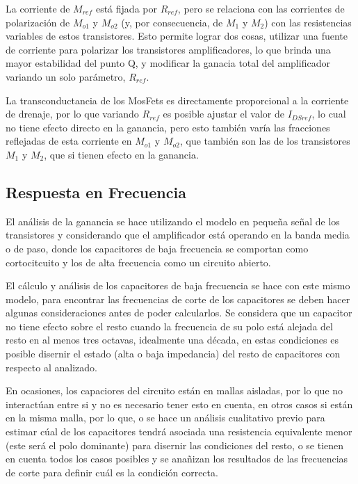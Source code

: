 La corriente de $M_{ref}$ está fijada por $R_{ref}$, pero se relaciona con las corrientes de polarización de $M_{o1}$ y $M_{o2}$ (y, por consecuencia, de $M_{1}$ y $M_{2}$) con las resistencias variables de estos transistores. Esto permite lograr dos cosas, utilizar una fuente de corriente para polarizar los transistores amplificadores, lo que brinda una mayor estabilidad del punto Q, y modificar la ganacia total del amplificador variando un solo parámetro, $R_{ref}$.

La transconductancia de los MosFets es directamente proporcional a la corriente de drenaje, por lo que variando $R_{ref}$ es posible ajustar el valor de $I_{DSref}$, lo cual no tiene efecto directo en la ganancia, pero esto también varía las fracciones reflejadas de esta corriente en $M_{o1}$ y $M_{o2}$, que también son las de los transistores $M_{1}$ y $M_{2}$, que si tienen efecto en la ganancia. 

\subsection{Respuesta en Frecuencia}

El análisis de la ganancia se hace utilizando el modelo en pequeña señal de los transistores y considerando que el amplificador está operando en la banda media o de paso, donde los capacitores de baja frecuencia se comportan como cortocitcuito y los de alta frecuencia como un circuito abierto.

El cálculo y análisis de los capacitores de baja frecuencia se hace con este mismo modelo, para encontrar las frecuencias de corte de los capacitores se deben hacer algunas consideraciones antes de poder calcularlos. Se considera que un capacitor no tiene efecto sobre el resto cuando la frecuencia de su polo está alejada del resto en al menos tres octavas, idealmente una década, en estas condiciones es posible disernir el estado (alta o baja impedancia) del resto de capacitores con respecto al analizado.

En ocasiones, los capaciores del circuito están en mallas aisladas, por lo que no interactúan entre si y no es necesario tener esto en cuenta, en otros casos si están en la misma malla, por lo que, o se hace un análisis cualitativo previo para estimar cúal de los capacitores tendrá asociada una resistencia equivalente menor (este será el polo dominante) para disernir las condiciones del resto, o se tienen en cuenta todos los casos posibles y se anañizan los resultados de las frecuencias de corte para definir cuál es la condición correcta.

